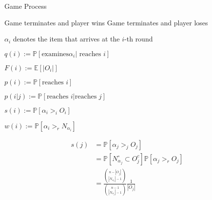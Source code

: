 \documentclass{article}
\newcommand{\prob}{\mathbb{P}}
\newcommand{\expec}{\mathbb{E}}
\newcommand{\gt}{>}
\begin{document}
\begin{algorithm}
\caption{Game Process}
\label{algo1} 
\begin{algorithmic}[1]







			\State Game terminates and player wins
		\Else
			\State Game terminates and player loses
			\EndIf
			
		
	\EndIf
	
	
\EndFor

\end{algorithmic}
\end{algorithm}

\pagebreak

$\alpha_i$ denotes the item that arrives at the $i$-th round

$q(i) := \prob[\text{examines} \alpha_i | \text{ reaches }i]$

$F(i) := \expec[|O_i|]$

$p(i):= \prob[\text{reaches }i]$

$p(i|j):= \prob[\text{reaches }i | \text{reaches }j]$

$s(i) := \prob[\alpha_i \gt_i O_i]$ 

$w(i) := \prob[\alpha_i \gt_r N_{\alpha_i}]$


\begin{align*}
s(j) &= \prob[\alpha_j \gt_j O_j]\\
&= \prob[N_{\alpha_j}^\circ \subset O_j^c]\prob[\alpha_j \gt_r O_j] \\
&= \frac{\binom{n-|O_j|}{|N_{\alpha_j}|-1}}{ \binom{n-1}{|N_{\alpha_j}|-1}} \frac{1}{|O_j|}
\end{align*}
\end{document}
